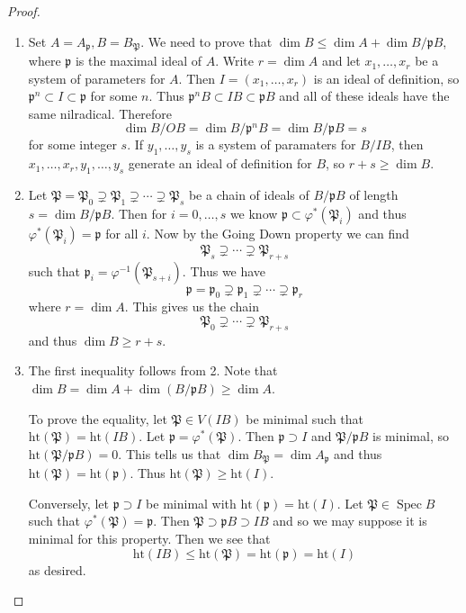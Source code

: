 \documentclass[leqno, openany]{memoir}
\theoremstyle{definition}
\theoremstyle{remark}
\theoremstyle{plain}
\theoremstyle{definition}
\theoremstyle{remark}
\newcommand{\mf}[1]{\mathfrak{#1}}
\newcommand{\mr}[1]{\mathrm{#1}}
\DeclareMathOperator{\Spec}{Spec}
\begin{document}
\begin{proof} \begin{enumerate} \item Set $A = A_{\mf{p}}, B = B_{\mf{P}}$. We
    need to prove that $\dim B \leq \dim A + \dim B / \mf{p}B$, where $\mf{p}$
    is the maximal ideal of $A$. Write $r = \dim A$ and let $x_1, \ldots, x_r$
    be a system of parameters for $A$. Then $I = (x_1, \ldots, x_r)$ is an
    ideal of definition, so $\mf{p}^n \subset I \subset \mf{p}$ for some $n$.
    Thus $\mf{p}^n B \subset IB \subset \mf{p}B$ and all of these ideals have
    the same nilradical. Therefore \[ \dim B / OB = \dim B / \mf{p}^n B = \dim
    B / \mf{p}B = s \] for some integer $s$. If $y_1, \ldots, y_s$ is a system
    of paramaters for $B / IB$, then $x_1, \ldots, x_r, y_1, \ldots, y_s$
    generate an ideal of definition for $B$, so $r + s \geq \dim B$.  \item Let
    $\mf{P} = \mf{P}_0 \supsetneq \mf{P}_1 \supsetneq \cdots \supsetneq
    \mf{P}_s$ be a chain of ideals of $B / \mf{p}B$ of length $s = \dim B /
    \mf{p}B$. Then for $i = 0, \ldots, s$ we know $\mf{p} \subset
    \varphi^*(\mf{P}_i)$ and thus $\varphi^*(\mf{P}_i) = \mf{p}$ for all $i$.
    Now by the Going Down property we can find \[ \mf{P}_s \supsetneq \cdots
        \supsetneq \mf{P}_{r+s} \] such that $\mf{p}_i =
        \varphi^{-1}(\mf{P}_{s+i})$. Thus we have \[ \mf{p} = \mf{p}_0
        \supsetneq \mf{p}_1 \supsetneq \cdots \supsetneq \mf{p}_r \] where $r =
        \dim A$. This gives us the chain \[ \mf{P}_0 \supsetneq \cdots
        \supsetneq \mf{P}_{r+s} \] and thus $\dim B \geq r+s$.  \item The first
        inequality follows from 2. Note that $\dim B = \dim A + \dim(B /
        \mf{p}B) \geq \dim A$.

            To prove the equality, let $\mf{P} \in V(IB)$ be minimal such that
            $\mr{ht}(\mf{P}) = \mr{ht}(IB)$. Let $\mf{p} = \varphi^*(\mf{P})$.
            Then $\mf{p} \supset I$ and $\mf{P} / \mf{p}B$ is minimal, so
            $\mr{ht}(\mf{P}/\mf{p}B) = 0$. This tells us that $\dim B_{\mf{P}}
            = \dim A_{\mf{p}}$ and thus $\mr{ht}(\mf{P}) = \mr{ht}(\mf{p})$.
            Thus $\mr{ht}(\mf{P}) \geq \mr{ht}(I)$.

            Conversely, let $\mf{p} \supset I$ be minimal with $\mr{ht}(\mf{p})
            = \mr{ht}(I)$. Let $\mf{P} \in \Spec B$ such that
            $\varphi^*(\mf{P}) = \mf{p}$. Then $\mf{P} \supset \mf{p}B \supset
            IB$ and so we may suppose it is minimal for this property. Then we
            see that \[ \mr{ht}(IB) \leq \mr{ht}(\mf{P}) = \mr{ht}(\mf{p}) =
            \mr{ht}(I) \] as desired. \qedhere \end{enumerate} \end{proof}
\end{document}
